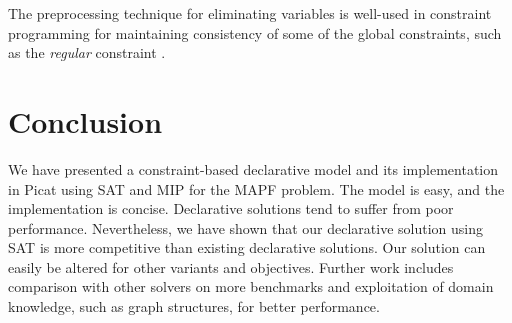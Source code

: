\documentclass[conference]{IEEEtran}
\newcommand{\ignore}[1]{}
\begin{document}
The preprocessing technique for eliminating variables is well-used in constraint programming for maintaining consistency of some of the global constraints, such as the \textit{regular} constraint \cite{Pesant04}. %

\ignore{
  In \cite{YuL15d}, a declarative model that formulates MAPF as a network flow problem is given. Experimental results are reported for optimizing four different types of objectives. While a direct comparison is impossible at this stage, an indirect comparison also reveals the competitiveness of our solution. In \cite{YuL15d}, heuristics that do not preserve optimality of plans are used in order to solve instances for the grid size of $32\times 32$.
}

\section{Conclusion}
We have presented a constraint-based declarative model and its implementation in Picat using SAT and MIP for the MAPF problem. The model is easy, and the implementation is concise. Declarative solutions tend to suffer from poor performance. Nevertheless, we have shown that our declarative solution using SAT is more competitive than existing declarative solutions. Our solution can easily be altered for other variants and objectives. Further work includes comparison with other solvers on more benchmarks and exploitation of domain knowledge, such as graph structures, for better performance.

\ignore{
\section*{Acknowledgements}
The authors would like to thank Esra Erdem for giving advice on running the ASP program, Pavel Surynek for providing MDD-SAT and clarifying differences in encodings, and Jonathan Fruhman for valuable comments on the presentation. Neng-Fa Zhou is supported in part by the NSF under grant number CCF1618046, and Roman Bart\'{a}k is supported the Czech Science Foundation under the project P202/12/G061 and together with Roni Stern by the Czech-Israeli Cooperative Scientific Research Project 8G15027.
}


\end{document}
